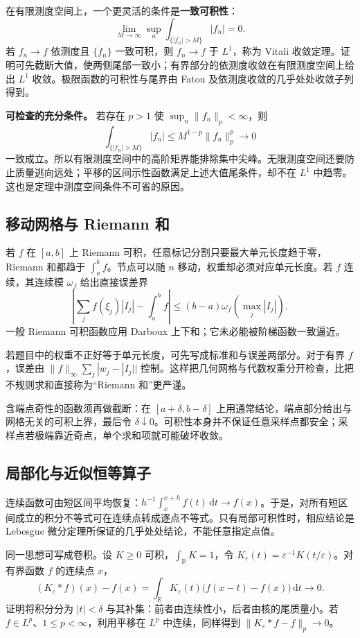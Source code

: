\documentclass[12pt,fontset=fandol]{ctexart}
\begin{document}
在有限测度空间上，一个更灵活的条件是\textbf{一致可积性}：
\[
\lim_{M\to\infty}\sup_n\int_{\{|f_n|>M\}}|f_n|=0.
\]
若 $f_n\to f$ 依测度且 $\{f_n\}$ 一致可积，则 $f_n\to f$ 于 $L^1$，称为 Vitali 收敛定理。证明可先截断大值，使两侧尾部一致小；有界部分的依测度收敛在有限测度空间上给出 $L^1$ 收敛。极限函数的可积性与尾界由 Fatou 及依测度收敛的几乎处处收敛子列得到。

\textbf{可检查的充分条件。} 若存在 $p>1$ 使 $\sup_n\|f_n\|_p<\infty$，则
\[
\int_{\{|f_n|>M\}}|f_n|\leq M^{1-p}\|f_n\|_p^p\longrightarrow0
\]
一致成立。所以有限测度空间中的高阶矩界能排除集中尖峰。无限测度空间还要防止质量逃向远处；平移的区间示性函数满足上述大值尾条件，却不在 $L^1$ 中趋零。这也是定理中测度空间条件不可省的原因。

\subsection{移动网格与 Riemann 和}

\label{app:integration-riemann}

若 $f$ 在 $[a,b]$ 上 Riemann 可积，任意标记分割只要最大单元长度趋于零，Riemann 和都趋于 $\int_a^bf$。节点可以随 $n$ 移动，权重却必须对应单元长度。若 $f$ 连续，其连续模 $\omega_f$ 给出直接误差界
\[
\left|\sum_jf(\xi_j)|I_j|-\int_a^bf\right|
\leq(b-a)\omega_f\!\left(\max_j|I_j|\right).
\]
一般 Riemann 可积函数应用 Darboux 上下和；它未必能被阶梯函数一致逼近。

若题目中的权重不正好等于单元长度，可先写成标准和与误差两部分。对于有界 $f$，误差由 $\|f\|_\infty\sum_j|w_j-|I_j||$ 控制。这样把几何网格与代数权重分开检查，比把不规则求和直接称为“Riemann 和”更严谨。

含端点奇性的函数须再做截断：在 $[a+\delta,b-\delta]$ 上用通常结论，端点部分给出与网格无关的可积上界，最后令 $\delta\downarrow0$。可积性本身并不保证任意采样点都安全；采样点若极端靠近奇点，单个求和项就可能破坏收敛。

\subsection{局部化与近似恒等算子}

\label{app:integration-local}

连续函数可由短区间平均恢复：$h^{-1}\int_x^{x+h}f(t)\,\mathrm dt\to f(x)$。于是，对所有短区间成立的积分不等式可在连续点转成逐点不等式。只有局部可积性时，相应结论是 Lebesgue 微分定理所保证的几乎处处结论，不能任意指定点值。

同一思想可写成卷积。设 $K\geq0$ 可积，$\int_{\mathbb R}K=1$，令 $K_\varepsilon(t)=\varepsilon^{-1}K(t/\varepsilon)$。对有界函数 $f$ 的连续点 $x$，
\[
(K_\varepsilon*f)(x)-f(x)
=\int_{\mathbb R}K_\varepsilon(t)\bigl(f(x-t)-f(x)\bigr)\,\mathrm dt\longrightarrow0.
\]
证明将积分分为 $|t|<\delta$ 与其补集：前者由连续性小，后者由核的尾质量小。若 $f\in L^p$、$1\leq p<\infty$，利用平移在 $L^p$ 中连续，同样得到 $\|K_\varepsilon*f-f\|_p\to0$。
\end{document}
